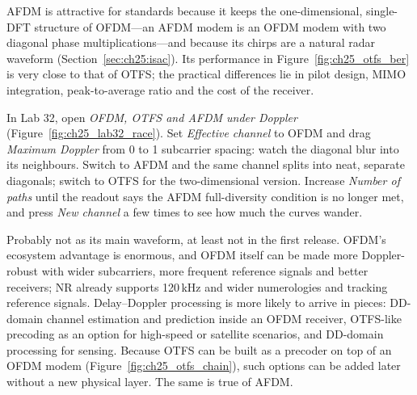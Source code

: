 
AFDM is attractive for standards because it keeps the one-dimensional, single-DFT structure of
OFDM---an AFDM modem is an OFDM modem with two diagonal phase multiplications---and because its
chirps are a natural radar waveform (Section~\ref{sec:ch25:isac}). Its performance in
Figure~\ref{fig:ch25_otfs_ber} is very close to that of OTFS; the practical differences lie in pilot
design, MIMO integration, peak-to-average ratio and the cost of the receiver.


\begin{tryit}
In Lab 32, open \emph{OFDM, OTFS and AFDM under Doppler} (Figure~\ref{fig:ch25_lab32_race}). Set
\emph{Effective channel} to OFDM and drag \emph{Maximum Doppler} from 0 to 1 subcarrier spacing:
watch the diagonal blur into its neighbours. Switch to AFDM and the same channel splits into neat,
separate diagonals; switch to OTFS for the two-dimensional version. Increase \emph{Number of paths}
until the readout says the AFDM full-diversity condition is no longer met, and press \emph{New
channel} a few times to see how much the curves wander.
\end{tryit}

\begin{inpractice}
Probably not as its main waveform, at least not in the first release. OFDM's ecosystem advantage is
enormous, and OFDM itself can be made more Doppler-robust with wider subcarriers, more frequent
reference signals and better receivers; NR already supports 120\,kHz and wider numerologies and
tracking reference signals. Delay--Doppler processing is more likely to arrive in pieces: DD-domain
channel estimation and prediction inside an OFDM receiver, OTFS-like precoding as an option for
high-speed or satellite scenarios, and DD-domain processing for sensing. Because OTFS can be built
as a precoder on top of an OFDM modem (Figure~\ref{fig:ch25_otfs_chain}), such options can be added
later without a new physical layer. The same is true of AFDM.
\end{inpractice}

